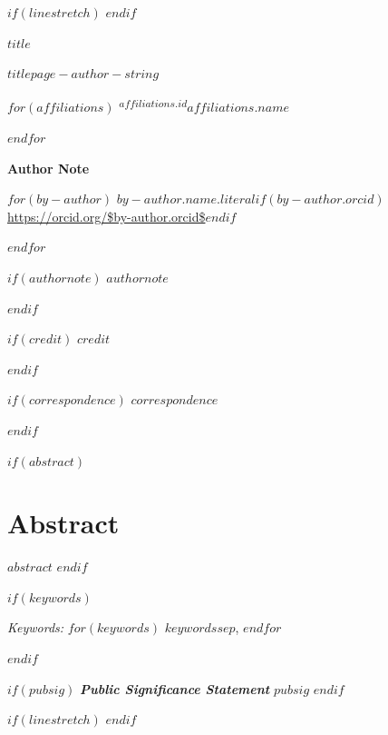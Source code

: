\begin{titlepage}

\thispagestyle{fancy}

$if(linestretch)$
\begingroup
\renewcommand{\baselinestretch}{$linestretch$}\normalsize
$endif$

\begin{center}

\vspace*{2cm}

{\bfseries $title$ \par}

\vspace{1cm}

$titlepage-author-string$ \par

\vspace{0.5cm}

$for(affiliations)$
\textsuperscript{$affiliations.id$}$affiliations.name$ \par
$endfor$

\clearpage

{\bfseries Author Note \par}

\vspace{0.5cm}

\end{center}

\raggedright

$for(by-author)$
\hspace*{1.27cm}$by-author.name.literal$$if(by-author.orcid)$  \url{https://orcid.org/$by-author.orcid$}$endif$ \par
$endfor$

$if(authornote)$
\hspace*{1.27cm}$authornote$
\par
$endif$

$if(credit)$
\hspace*{1.27cm}$credit$
\par
$endif$

$if(correspondence)$
\hspace*{1.27cm}$correspondence$
\par
$endif$

\clearpage

$if(abstract)$
\section{Abstract}
$abstract$
$endif$

$if(keywords)$
\par\hspace*{1.27cm}\emph{Keywords:}
$for(keywords)$
$keywords$$sep$, $endfor$
\par
$endif$

$if(pubsig)$
\textbf{\emph{Public Significance Statement}}\newline
$pubsig$
$endif$

$if(linestretch)$
\endgroup
$endif$

\end{titlepage}

\addtocounter{page}{1}